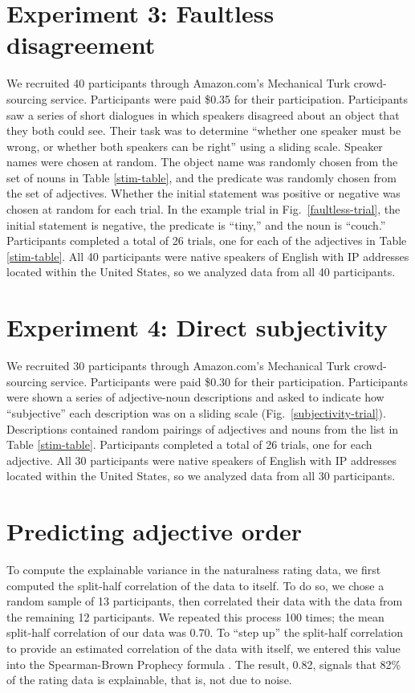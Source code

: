 \documentclass{pnastwo}
\begin{document}
\begin{article}
\begin{materials}
\section{Experiment 3: Faultless disagreement}
We recruited 40 participants through Amazon.com's Mechanical Turk crowd-sourcing service. Participants were paid \$0.35 for their participation. Participants saw a series of short dialogues in which speakers disagreed about an object that they both could see.  Their task was to determine ``whether one speaker must be wrong, or whether both speakers can be right'' using a sliding scale. Speaker names were chosen at random. The object name was randomly chosen from the set of nouns in Table \ref{stim-table}, and the predicate was randomly chosen from the set of adjectives. Whether the initial statement was positive or negative was chosen at random for each trial. In the example trial in Fig.~\ref{faultless-trial}, the initial statement is negative, the predicate is ``tiny,'' and the noun is ``couch.'' Participants completed a total of 26 trials, one for each of the adjectives in Table \ref{stim-table}.
All 40 participants were native speakers of English with IP addresses located within the United States, so we analyzed data from all 40 participants.

\section{Experiment 4: Direct subjectivity}
We recruited 30 participants through Amazon.com's Mechanical Turk crowd-sourcing service. Participants were paid \$0.30 for their participation. Participants were shown a series of adjective-noun descriptions and asked to indicate how ``subjective'' each description was on a sliding scale (Fig.~\ref{subjectivity-trial}). Descriptions contained random pairings of adjectives and nouns from the list in Table \ref{stim-table}. Participants completed a total of 26 trials, one for each adjective. All 30 participants were native speakers of English with IP addresses located within the United States, so we analyzed data from all 30 participants.

\section{Predicting adjective order}
To compute the explainable variance in the naturalness rating data, we first computed the split-half correlation of the data to itself. To do so, we chose a random sample of 13 participants, then correlated their data with the data from the remaining 12 participants. We repeated this process 100 times; the mean split-half correlation of our data was 0.70. To ``step up'' the split-half correlation to provide an estimated correlation of the data with itself, we entered this value into the Spearman-Brown Prophecy formula \cite{stanley1971}. The result, 0.82, signals that 82\% of the rating data is explainable, that is, not due to noise.


\end{materials}
\end{article}
\end{document}
